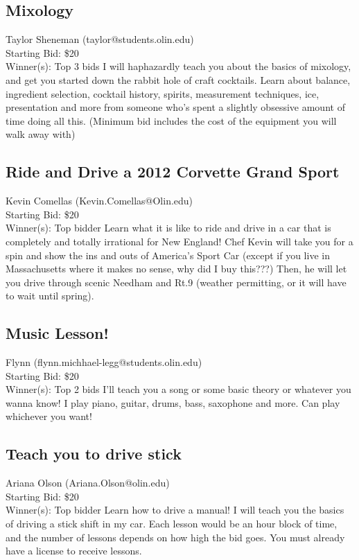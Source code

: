 \documentclass[11pt]{article}
\begin{document}
\subsection{Mixology}
Taylor Sheneman (taylor@students.olin.edu) \\
Starting Bid: \$20 \\
Winner(s): 
Top 3 bids\newline
I will haphazardly teach you about the basics of mixology, and get you started down the rabbit hole of craft cocktails. Learn about balance, ingredient selection, cocktail history, spirits, measurement techniques, ice, presentation and more from someone who's spent a slightly obsessive amount of time doing all this. (Minimum bid includes the cost of the equipment you will walk away with)
\subsection{Ride and Drive a 2012 Corvette Grand Sport}
Kevin Comellas (Kevin.Comellas@Olin.edu) \\
Starting Bid: \$20 \\
Winner(s): 
Top bidder\newline
Learn what it is like to ride and drive in a car that is completely and totally irrational for New England! Chef Kevin will take you for a spin and show the ins and outs of America's Sport Car (except if you live in Massachusetts where it makes no sense, why did I buy this???) Then, he will let you drive through scenic Needham and Rt.9 (weather permitting, or it will have to wait until spring).
\subsection{Music Lesson!}
Flynn (flynn.michhael-legg@students.olin.edu) \\
Starting Bid: \$20 \\
Winner(s): 
Top 2 bids\newline
I'll teach you a song or some basic theory or whatever you wanna know! I play piano, guitar, drums, bass, saxophone and more. Can play whichever you want!
\subsection{Teach you to drive stick}
Ariana Olson (Ariana.Olson@olin.edu) \\
Starting Bid: \$20 \\
Winner(s): 
Top bidder\newline
Learn how to drive a manual! I will teach you the basics of driving a stick shift in my car. Each lesson would be an hour block of time, and the number of lessons depends on how high the bid goes. You must already have a license to receive lessons.
\end{document}
